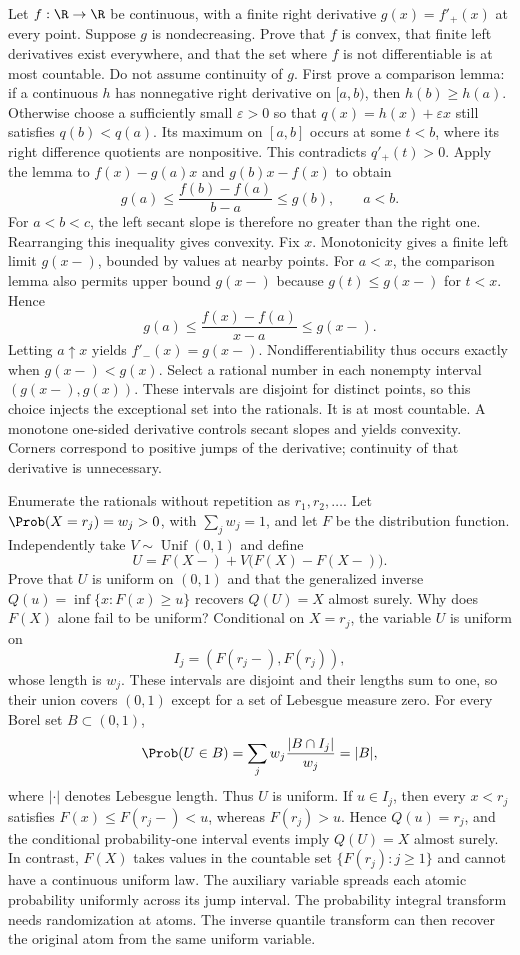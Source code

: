 Let $f:\R\to\R$ be continuous, with a finite right derivative $g(x)=f'_+(x)$ at every point. Suppose $g$ is nondecreasing. Prove that $f$ is convex, that finite left derivatives exist everywhere, and that the set where $f$ is not differentiable is at most countable. Do not assume continuity of $g$.
\solution First prove a comparison lemma: if a continuous $h$ has nonnegative right derivative on $[a,b)$, then $h(b)\ge h(a)$. Otherwise choose a sufficiently small $\varepsilon>0$ so that $q(x)=h(x)+\varepsilon x$ still satisfies $q(b)<q(a)$. Its maximum on $[a,b]$ occurs at some $t<b$, where its right difference quotients are nonpositive. This contradicts $q'_+(t)>0$.
Apply the lemma to $f(x)-g(a)x$ and $g(b)x-f(x)$ to obtain
\[
 g(a)\le\frac{f(b)-f(a)}{b-a}\le g(b),\qquad a<b.
\]
For $a<b<c$, the left secant slope is therefore no greater than the right one. Rearranging this inequality gives convexity.
Fix $x$. Monotonicity gives a finite left limit $g(x-)$, bounded by values at nearby points. For $a<x$, the comparison lemma also permits upper bound $g(x-)$ because $g(t)\le g(x-)$ for $t<x$. Hence
\[
 g(a)\le\frac{f(x)-f(a)}{x-a}\le g(x-).
\]
Letting $a\uparrow x$ yields $f'_-(x)=g(x-)$. Nondifferentiability thus occurs exactly when $g(x-)<g(x)$. Select a rational number in each nonempty interval $(g(x-),g(x))$. These intervals are disjoint for distinct points, so this choice injects the exceptional set into the rationals. It is at most countable.
\insight A monotone one-sided derivative controls secant slopes and yields convexity. Corners correspond to positive jumps of the derivative; continuity of that derivative is unnecessary.

Enumerate the rationals without repetition as $r_1,r_2,\ldots$. Let $\Prob(X=r_j)=w_j>0$, with $\sum_jw_j=1$, and let $F$ be the distribution function. Independently take $V\sim\operatorname{Unif}(0,1)$ and define
\[
 U=F(X-)+V\bigl(F(X)-F(X-)\bigr).
\]
Prove that $U$ is uniform on $(0,1)$ and that the generalized inverse $Q(u)=\inf\{x:F(x)\ge u\}$ recovers $Q(U)=X$ almost surely. Why does $F(X)$ alone fail to be uniform?
\solution Conditional on $X=r_j$, the variable $U$ is uniform on
\[
 I_j=(F(r_j-),F(r_j)),
\]
whose length is $w_j$. These intervals are disjoint and their lengths sum to one, so their union covers $(0,1)$ except for a set of Lebesgue measure zero. For every Borel set $B\subset(0,1)$,
\[
 \Prob(U\in B)=\sum_jw_j\frac{|B\cap I_j|}{w_j}
 =|B|,
\]
where $|\cdot|$ denotes Lebesgue length. Thus $U$ is uniform.
If $u\in I_j$, then every $x<r_j$ satisfies $F(x)\le F(r_j-)<u$, whereas $F(r_j)>u$. Hence $Q(u)=r_j$, and the conditional probability-one interval events imply $Q(U)=X$ almost surely.
In contrast, $F(X)$ takes values in the countable set $\{F(r_j):j\ge1\}$ and cannot have a continuous uniform law. The auxiliary variable spreads each atomic probability uniformly across its jump interval.
\insight The probability integral transform needs randomization at atoms. The inverse quantile transform can then recover the original atom from the same uniform variable.


